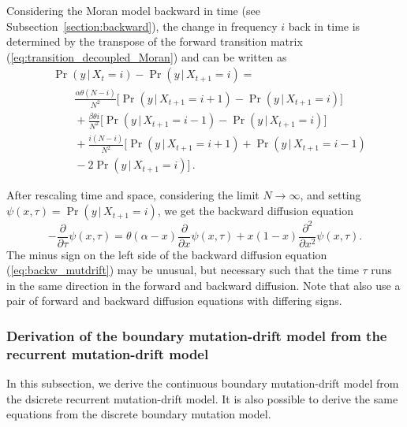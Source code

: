 \documentclass[preprint]{elsarticle}
\newcommand\given{{\,|\,}}
\newcommand\x[1]{\ensuremath{X_{#1}}}
\begin{document}
{Considering the Moran model backward in time (see Subsection~\ref{section:backward}), the change in frequency $i$ back in time is determined by the transpose of the forward transition matrix (\ref{eq:transition_decoupled_Moran}) and can be written as
\begin{equation}\label{eq:back_discr_mutation}
\begin{split}
&\Pr(y \given\x{t}=i)-\Pr(y\given\x{t+1}=i) = \\
&\qquad \frac{\alpha \theta (N-i)}{N^2} \bigg[\Pr(y\given\x{t+1}=i+1)-\Pr(y\given\x{t+1}=i)\bigg]\\
&\qquad+ \frac{\beta \theta i}{N^2} \bigg[\Pr(y\given\x{t+1}=i-1)-\Pr(y\given\x{t+1}=i)\bigg]\\
&\qquad+ \frac{i(N-i)}{N^2} \bigg[\Pr(y\given\x{t+1}=i+1)+\Pr(y\given\x{t+1}=i-1)\\
&\qquad-2\Pr(y\given\x{t+1}=i)\bigg]\,.
\end{split}
\end{equation}

After rescaling time and space, considering the limit $N \to \infty$, and setting $\psi(x,\tau)=\Pr(y\given \x{t+1}=i)$, we get the backward diffusion equation
\begin{equation}\label{eq:backw_mutdrift}
-\frac{\partial}{\partial \tau} \psi(x,\tau) =
    \theta(\alpha-x)\frac{\partial}{\partial x} \psi(x,\tau) +x(1-x)\frac{\partial^2}{\partial x^2}\psi(x,\tau).
\end{equation}
The minus sign on the left side of the backward diffusion equation (\ref{eq:backw_mutdrift}) may be unusual, but necessary such that the time $\tau$ runs in the same direction in the forward and backward diffusion. Note that \citet{Zhao13a} also use a pair of forward and backward diffusion equations with differing signs.


\subsubsection{Derivation of the boundary mutation-drift model from the recurrent mutation-drift model}\label{section:backward_derivation}

In this subsection, we derive the continuous boundary mutation-drift model from the dsicrete recurrent mutation-drift model. It is also possible to derive the same equations from the discrete boundary mutation model.

}
\end{document}
